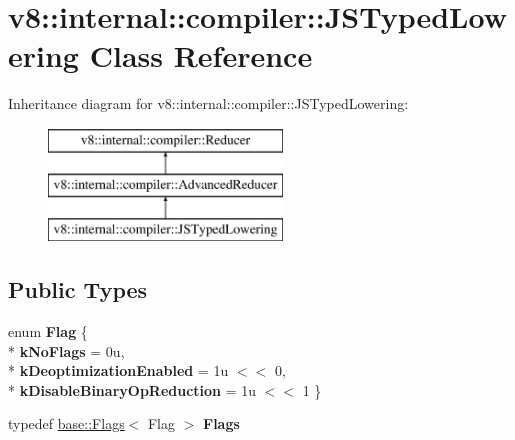 \hypertarget{classv8_1_1internal_1_1compiler_1_1_j_s_typed_lowering}{}\section{v8\+:\+:internal\+:\+:compiler\+:\+:J\+S\+Typed\+Lowering Class Reference}
\label{classv8_1_1internal_1_1compiler_1_1_j_s_typed_lowering}
Inheritance diagram for v8\+:\+:internal\+:\+:compiler\+:\+:J\+S\+Typed\+Lowering\+:\begin{figure}[H]
\begin{center}
\leavevmode
\includegraphics[height=3.000000cm]{classv8_1_1internal_1_1compiler_1_1_j_s_typed_lowering}
\end{center}
\end{figure}
\subsection*{Public Types}
\begin{DoxyCompactItemize}
\item 
enum {\bfseries Flag} \{ \\*
{\bfseries k\+No\+Flags} = 0u, 
\\*
{\bfseries k\+Deoptimization\+Enabled} = 1u $<$$<$ 0, 
\\*
{\bfseries k\+Disable\+Binary\+Op\+Reduction} = 1u $<$$<$ 1
 \}\hypertarget{classv8_1_1internal_1_1compiler_1_1_j_s_typed_lowering_ad2a8dffd4c5f567eaf9bfce80586ffa5}{}\label{classv8_1_1internal_1_1compiler_1_1_j_s_typed_lowering_ad2a8dffd4c5f567eaf9bfce80586ffa5}

\item 
typedef \hyperlink{classv8_1_1base_1_1_flags}{base\+::\+Flags}$<$ Flag $>$ {\bfseries Flags}\hypertarget{classv8_1_1internal_1_1compiler_1_1_j_s_typed_lowering_a8c73fa261c873e9528a5433ec866c8c8}{}\label{classv8_1_1internal_1_1compiler_1_1_j_s_typed_lowering_a8c73fa261c873e9528a5433ec866c8c8}

\end{DoxyCompactItemize}
